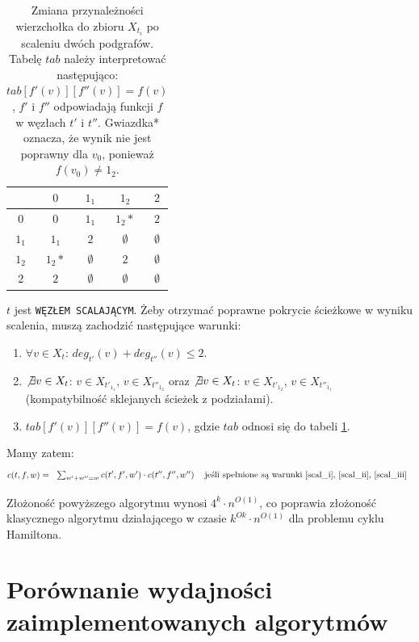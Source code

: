 \documentclass[12pt, oneside]{report}
\newcommand\Omicron{O}
\newcommand{\nexists}{\not\exists}
\begin{document}
\begin{table}
\centering
\begin{tabular}{c|c|c|c|c}
 & $0$ & $1_1$ & $1_2$ & $2$ \\
\hline
$0$ & $0$ & $1_1$ & $1_2*$ & $2$ \\
\hline
$1_1$ & $1_1$ & $2$ & $\emptyset$ & $\emptyset$ \\
\hline
$1_2$ & $1_2*$ & $\emptyset$ & $2$ & $\emptyset$ \\
\hline
$2$ & $2$ & $\emptyset$ & $\emptyset$ & $\emptyset$ \\
\end{tabular}
\caption{Zmiana przynależności wierzchołka do zbioru $X_{t_i}$ po scaleniu dwóch podgrafów. Tabelę $tab$ należy interpretować następująco: $tab[f'(v)][f''(v)] = f(v)$, $f'$ i $f''$ odpowiadają funkcji $f$ w węzłach $t'$ i $t''$. Gwiazdka* oznacza, że wynik nie jest poprawny dla $v_0$, ponieważ $f(v_0) \neq 1_2$.}
\label{merge_table}
\end{table}
\noindent$t$ jest \texttt{WĘZŁEM SCALAJĄCYM}. Żeby otrzymać poprawne pokrycie ścieżkowe w wyniku scalenia, muszą zachodzić następujące warunki:
\begin{enumerate}[label=(\roman*)]
\item \label{scal_i}$\forall v \in X_t$: $deg_{t'}(v) + deg_{t''}(v) \leq 2$.
\item \label{scal_ii}$\nexists v \in X_t$: $v \in X_{t'_{1_1}}$, $v \in X_{t''_{1_2}}$ oraz $\nexists v \in X_t$: $v \in X_{t'_{1_2}}$, $v \in X_{t''_{1_1}}$ (kompatybilność sklejanych ścieżek z podziałami).
\item \label{scal_iii}$tab[f'(v)][f''(v)] = f(v)$, gdzie $tab$ odnosi się do tabeli \ref{merge_table}.
\end{enumerate}
Mamy zatem:
\[
c(t,f,w) =  
  \begin{tabular}{ccc}
  $\sum_{w' + w'' = w} c(t',f',w') \cdot c(t'',f'',w'')$ & jeśli spełnione są warunki \ref{scal_i}, \ref{scal_ii}, \ref{scal_iii}\\
  \end{tabular}
\]

Złożoność powyższego algorytmu wynosi $4^k \cdot n^{\Omicron(1)}$, co poprawia złożoność klasycznego algorytmu działającego w czasie $k^{\Omicron{k}} \cdot n^{\Omicron{(1)}}$ dla problemu cyklu Hamiltona.

\newpage
  	\chapter{Porównanie wydajności zaimplementowanych algorytmów}
  	\label{summary}
\end{document}
